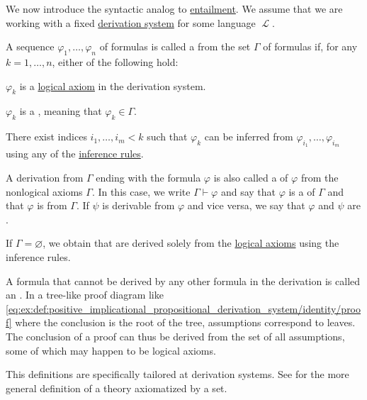 \begin{definition}\label{def:derivation_system_derivability}
  We now introduce the syntactic analog to \hyperref[def:first_order_semantics/entailment]{entailment}. We assume that we are working with a fixed \hyperref[def:proof_derivation_system]{derivation system} for some language \( \mscrL \).

 A sequence \( \varphi_1, \ldots, \varphi_n \) of formulas is called a  from the set \( \Gamma \) of formulas if, for any \( k = 1, \ldots, n \), either of the following hold:
  \begin{thmenum}
     \( \varphi_k \) is a \hyperref[def:proof_derivation_system/axioms]{logical axiom} in the derivation system.

     \( \varphi_k \) is a , meaning that \( \varphi_k \in \Gamma \).

     There exist indices \( i_1, \ldots, i_m < k \) such that \( \varphi_k \) can be inferred from \( \varphi_{i_1}, \ldots, \varphi_{i_m} \) using any of the \hyperref[def:proof_derivation_system/rules]{inference rules}.
  \end{thmenum}

  A derivation from \( \Gamma \) ending with the formula \( \varphi \) is also called a  of \( \varphi \) from the nonlogical axioms \( \Gamma \). In this case, we write \( \Gamma \vdash \varphi \) and say that \( \varphi \) is a  of \( \Gamma \) and that \( \varphi \) is  from \( \Gamma \). If \( \psi \) is derivable from \( \varphi \) and vice versa, we say that \( \varphi \) and \( \psi \) are .

  If \( \Gamma = \varnothing \), we obtain  that are derived solely from the \hyperref[def:proof_derivation_system/axioms]{logical axioms} using the inference rules.

  A formula that cannot be derived by any other formula in the derivation is called an . In a tree-like proof diagram like \eqref{eq:ex:def:positive_implicational_propositional_derivation_system/identity/proof} where the conclusion is the root of the tree, assumptions correspond to leaves. The conclusion of a proof can thus be derived from the set of all assumptions, some of which may happen to be logical axioms.

  This definitions are specifically tailored at derivation systems. See  for the more general definition of a theory axiomatized by a set.
\end{definition}

